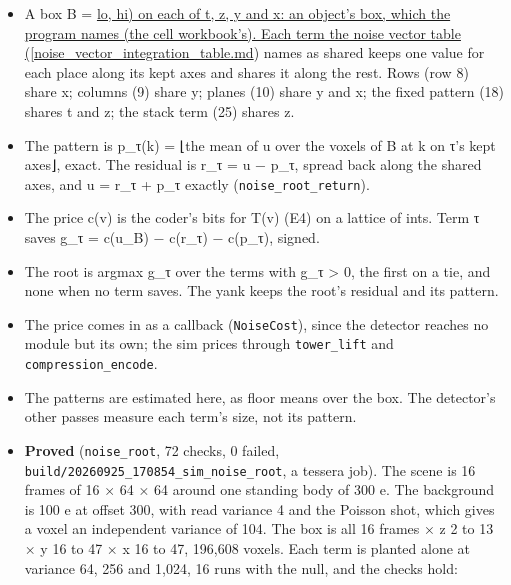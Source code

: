 \begin{itemize}
\item A box B = \hyperref[chap:noise-vector-integration-table]{lo, hi) on each of t, z, y and x: an object's box, which the program names (the cell workbook's). Each term the noise vector table ([noise\_\allowbreak{}vector\_\allowbreak{}integration\_\allowbreak{}table.md}) names as shared keeps one value for each place along its kept axes and shares it along the rest. Rows (row 8) share x; columns (9) share y; planes (10) share y and x; the fixed pattern (18) shares t and z; the stack term (25) shares z.
\item The pattern is p\_\allowbreak{}τ(k) = ⌊the mean of u over the voxels of B at k on τ's kept axes⌋, exact. The residual is r\_\allowbreak{}τ = u − p\_\allowbreak{}τ, spread back along the shared axes, and u = r\_\allowbreak{}τ + p\_\allowbreak{}τ exactly (\texttt{noise\_\allowbreak{}root\_\allowbreak{}return}).
\item The price c(v) is the coder's bits for T(v) (E4) on a lattice of ints. Term τ saves g\_\allowbreak{}τ = c(u\_\allowbreak{}B) − c(r\_\allowbreak{}τ) − c(p\_\allowbreak{}τ), signed.
\item The root is argmax g\_\allowbreak{}τ over the terms with g\_\allowbreak{}τ > 0, the first on a tie, and none when no term saves. The yank keeps the root's residual and its pattern.
\item The price comes in as a callback (\texttt{Noise\allowbreak{}Cost}), since the detector reaches no module but its own; the sim prices through \texttt{tower\_\allowbreak{}lift} and \texttt{compression\_\allowbreak{}encode}.
\item The patterns are estimated here, as floor means over the box. The detector's other passes measure each term's size, not its pattern.
\item \textbf{Proved} (\texttt{noise\_\allowbreak{}root}, 72 checks, 0 failed, \texttt{build/\allowbreak{}20260925\_\allowbreak{}170854\_\allowbreak{}sim\_\allowbreak{}noise\_\allowbreak{}root}, a tessera job). The scene is 16 frames of 16 × 64 × 64 around one standing body of 300 e. The background is 100 e at offset 300, with read variance 4 and the Poisson shot, which gives a voxel an independent variance of 104. The box is all 16 frames × z 2 to 13 × y 16 to 47 × x 16 to 47, 196,608 voxels. Each term is planted alone at variance 64, 256 and 1,024, 16 runs with the null, and the checks hold:


\end{itemize}
